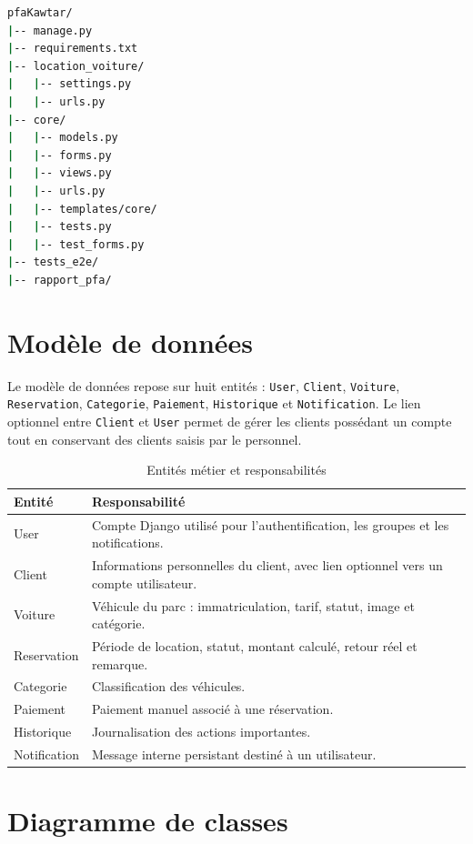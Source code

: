 \begin{lstlisting}[language=bash,caption={Structure simplifiée du dépôt}]
pfaKawtar/
|-- manage.py
|-- requirements.txt
|-- location_voiture/
|   |-- settings.py
|   |-- urls.py
|-- core/
|   |-- models.py
|   |-- forms.py
|   |-- views.py
|   |-- urls.py
|   |-- templates/core/
|   |-- tests.py
|   |-- test_forms.py
|-- tests_e2e/
|-- rapport_pfa/
\end{lstlisting}

\section{Modèle de données}

Le modèle de données repose sur huit entités : \texttt{User}, \texttt{Client}, \texttt{Voiture}, \texttt{Reservation}, \texttt{Categorie}, \texttt{Paiement}, \texttt{Historique} et \texttt{Notification}. Le lien optionnel entre \texttt{Client} et \texttt{User} permet de gérer les clients possédant un compte tout en conservant des clients saisis par le personnel.

\begin{table}[H]
\centering
\caption{Entités métier et responsabilités}
\begin{tabularx}{\textwidth}{|l|X|}
\hline
\textbf{Entité} & \textbf{Responsabilité} \\
\hline
User & Compte Django utilisé pour l'authentification, les groupes et les notifications. \\
\hline
Client & Informations personnelles du client, avec lien optionnel vers un compte utilisateur. \\
\hline
Voiture & Véhicule du parc : immatriculation, tarif, statut, image et catégorie. \\
\hline
Reservation & Période de location, statut, montant calculé, retour réel et remarque. \\
\hline
Categorie & Classification des véhicules. \\
\hline
Paiement & Paiement manuel associé à une réservation. \\
\hline
Historique & Journalisation des actions importantes. \\
\hline
Notification & Message interne persistant destiné à un utilisateur. \\
\hline
\end{tabularx}
\end{table}

\section{Diagramme de classes}

